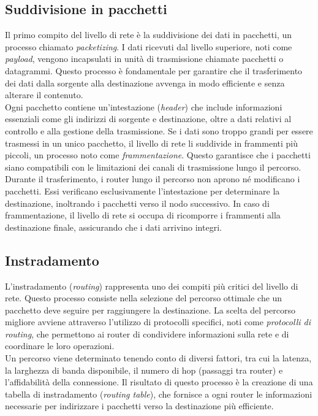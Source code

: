 \documentclass[12pt]{report}
\begin{document}
	\subsection{Suddivisione in pacchetti}
	Il primo compito del livello di rete è la suddivisione dei dati in pacchetti, un processo chiamato \textit{packetizing}. I dati ricevuti dal livello superiore, noti come \textit{payload}, vengono incapsulati in unità di trasmissione chiamate pacchetti o datagrammi. Questo processo è fondamentale per garantire che il trasferimento dei dati dalla sorgente alla destinazione avvenga in modo efficiente e senza alterare il contenuto.
	\vspace{\baselineskip}\\
	Ogni pacchetto contiene un'intestazione (\textit{header}) che include informazioni essenziali come gli indirizzi di sorgente e destinazione, oltre a dati relativi al controllo e alla gestione della trasmissione. Se i dati sono troppo grandi per essere trasmessi in un unico pacchetto, il livello di rete li suddivide in frammenti più piccoli, un processo noto come \textit{frammentazione}. Questo garantisce che i pacchetti siano compatibili con le limitazioni dei canali di trasmissione lungo il percorso.
	\vspace{\baselineskip}\\
	Durante il trasferimento, i router lungo il percorso non aprono né modificano i pacchetti. Essi verificano esclusivamente l'intestazione per determinare la destinazione, inoltrando i pacchetti verso il nodo successivo. In caso di frammentazione, il livello di rete si occupa di ricomporre i frammenti alla destinazione finale, assicurando che i dati arrivino integri.
	
	\subsection{Instradamento}
	L'instradamento (\textit{routing}) rappresenta uno dei compiti più critici del livello di rete. Questo processo consiste nella selezione del percorso ottimale che un pacchetto deve seguire per raggiungere la destinazione. La scelta del percorso migliore avviene attraverso l'utilizzo di protocolli specifici, noti come \textit{protocolli di routing}, che permettono ai router di condividere informazioni sulla rete e di coordinare le loro operazioni.
	\vspace{\baselineskip}\\
	Un percorso viene determinato tenendo conto di diversi fattori, tra cui la latenza, la larghezza di banda disponibile, il numero di hop (passaggi tra router) e l'affidabilità della connessione. Il risultato di questo processo è la creazione di una tabella di instradamento (\textit{routing table}), che fornisce a ogni router le informazioni necessarie per indirizzare i pacchetti verso la destinazione più efficiente.
	
\end{document}

